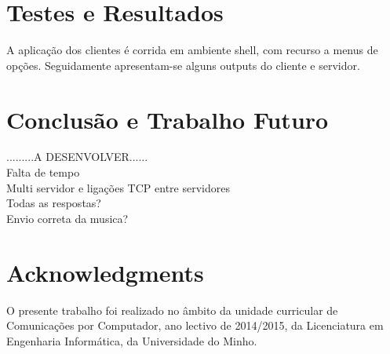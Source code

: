 \documentclass{llncs}
\begin{document}
\section{Testes e Resultados}
A aplicação dos clientes é corrida em ambiente shell, com recurso a menus de opções. 
Seguidamente apresentam-se alguns outputs do cliente e servidor.



\section{Conclusão e Trabalho Futuro}
.........A DESENVOLVER......\\
Falta de tempo\\
Multi servidor e ligações TCP entre servidores\\
Todas as respostas?\\
Envio correta da musica?\\

\section*{Acknowledgments}
O presente trabalho foi realizado no âmbito da unidade curricular de Comunicações por Computador, 
ano lectivo de 2014/2015, da Licenciatura em Engenharia Informática, da Universidade do Minho.



\end{document}
